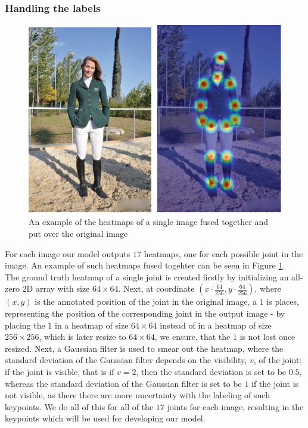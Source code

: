 \documentclass[./main.tex]{subfiles}
\begin{document}
\subsubsection{Handling the labels}
\begin{figure}[htbp]
    \centering
    \includegraphics[height = 4 cm]{./entities/heatmaps_ex.PNG}
    \caption{An example of the heatmaps of a single image fused together and put over the original image \cite{survey_1}}
    \label{fig:heatmaps_ex}
\end{figure}
\noindent For each image our model outputs $17$ heatmaps, one for each possible joint in the image. An example of such heatmaps fused togehter can be seen in Figure \ref{fig:heatmaps_ex}. \\
The ground truth heatmap of a single joint is created firstly by initializing an all-zero 2D array with size $64 \times 64$. Next, at coordinate $\left( x \cdot \frac{64}{256}, y \cdot \frac{64}{256} \right)$, where $(x, y)$ is the annotated position of the joint in the original image, a $1$ is places, representing the position of the corresponding joint in the output image - by placing the $1$ in a heatmap of size $64 \times 64$ instead of in a heatmap of size $256 \times 256$, which is later resize to $64 \times 64$, we ensure, that the $1$ is not lost once resized. Next, a Gaussian filter is used to smear out the heatmap, where the standard deviation of the Gaussian filter depends on the visibility, $v$, of the joint: if the joint is visible, that is if $v = 2$, then the standard deviation is set to be $0.5$, whereas the standard deviation of the Gaussian filter is set to be $1$ if the joint is not visible, as there there are more uncertainty with the labeling of such keypoints. We do all of this for all of the $17$ joints for each image, resulting in the keypoints which will be used for developing our model.
\end{document}
